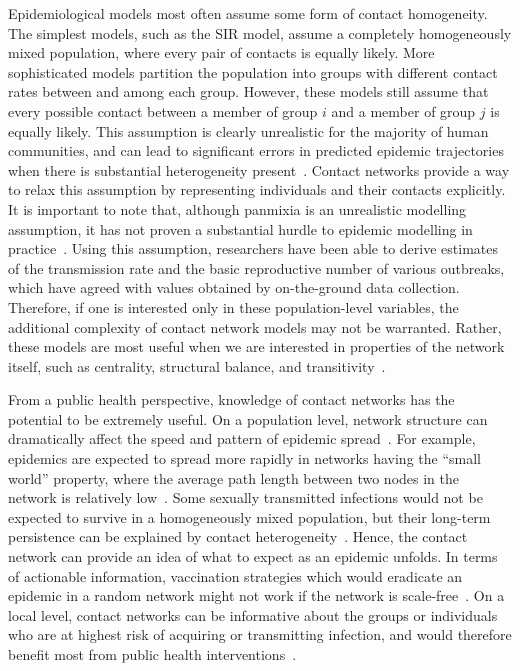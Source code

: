 Epidemiological models most often assume some form of contact homogeneity. The
simplest models, such as the \gls{SIR} model, assume a completely homogeneously
mixed population, where every pair of contacts is equally likely. More
sophisticated models partition the population into groups with different
contact rates between and among each group. However, these models still assume
that every possible contact between a member of group $i$ and a member of group
$j$ is equally likely. This assumption is clearly unrealistic for the majority
of human communities, and can lead to significant errors in predicted epidemic
trajectories when there is substantial heterogeneity
present~\autocite{bansal2007individual, volz2007susceptible}. Contact networks
provide a way to relax this assumption by representing individuals and their
contacts explicitly. It is important to note that, although panmixia is an
unrealistic modelling assumption, it has not proven a substantial hurdle to
epidemic modelling in practice~\autocite{anderson1992infectious}. Using this
assumption, researchers have been able to derive estimates of the transmission
rate and the basic reproductive number of various outbreaks, which have agreed
with values obtained by on-the-ground data collection. Therefore, if one is
interested only in these population-level variables, the additional complexity
of contact network models may not be warranted. Rather, these models are most
useful when we are interested in properties of the network itself, such as
centrality, structural balance, and
transitivity~\autocite{wasserman1994social}.

From a public health perspective, knowledge of contact networks has the
potential to be extremely useful. On a population level, network structure can
dramatically affect the speed and pattern of epidemic
spread~\autocite[\eg][]{barthelemy2005dynamical, volz2008sir}. For example,
epidemics are expected to spread more rapidly in networks having the ``small
world'' property, where the average path length between two nodes in the
network is relatively low~\autocite{watts1998collective}. Some sexually
transmitted infections would not be expected to survive in a homogeneously
mixed population, but their long-term persistence can be explained by contact
heterogeneity~\autocite{anderson1992infectious, pastor2001epidemic}. Hence, the
contact network can provide an idea of what to expect as an epidemic unfolds.
In terms of actionable information, vaccination strategies which would
eradicate an epidemic in a random network might not work if the network is
scale-free~\autocite[][see \cref{subsec:pa}]{keeling2005networks}. On a local
level, contact networks can be informative about the groups or individuals who
are at highest risk of acquiring or transmitting infection, and would therefore
benefit most from public health interventions~\autocite{wang2015targeting,
little2014using}.

